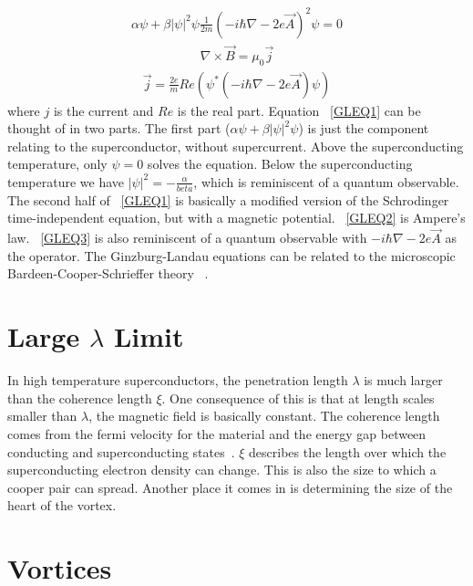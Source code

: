 \begin{eqnarray}
\alpha \psi + \beta |\psi|^2 \psi \frac {1} {2m} (-i \hbar \nabla - 2 e \overrightarrow A)^2 \psi = 0
\label{GLEQ1}
\end{eqnarray}
\begin{eqnarray}
\nabla \times \overrightarrow B = \mu_0 \overrightarrow j
\label{GLEQ2}
\end{eqnarray}
\begin{eqnarray}
\overrightarrow j = \frac {2e} {m} Re(\psi^* (-i \hbar \nabla - 2 e \overrightarrow A) \psi)
\label{GLEQ3}
\end{eqnarray}
where $j$ is the current and $Re$ is the real part. Equation ~\ref{GLEQ1} can be thought of in two parts. The first part ($\alpha \psi + \beta |\psi|^2 \psi $) is just the component relating to the superconductor, without supercurrent. Above the superconducting temperature, only $\psi = 0$ solves the equation. Below the superconducting temperature we have $|\psi|^2 = -\frac {\alpha} {beta}$, which is reminiscent of a quantum observable. The second half of ~\ref{GLEQ1} is basically a modified version of the Schrodinger time-independent equation, but with a magnetic potential. ~\ref{GLEQ2} is Ampere's law. ~\ref{GLEQ3} is also reminiscent of a quantum observable with $ -i \hbar \nabla - 2e \overrightarrow A$ as the operator. The Ginzburg-Landau equations can be related to the microscopic Bardeen-Cooper-Schrieffer theory ~\cite{Sadovskyy14}. 


\section{Large $\lambda$ Limit}
In high temperature superconductors, the penetration length $\lambda$ is much larger than the coherence length $\xi$. One consequence of this is that at length scales smaller than $\lambda$, the magnetic field is basically constant. The coherence length comes from the fermi velocity for the material and the energy gap between conducting and superconducting states~\cite{Kittel96}.  $\xi$ describes the length over which the superconducting electron density can change. This is also the size to which a cooper pair can spread. Another place it comes in is determining the size of the heart of the vortex. 

\section{Vortices}

